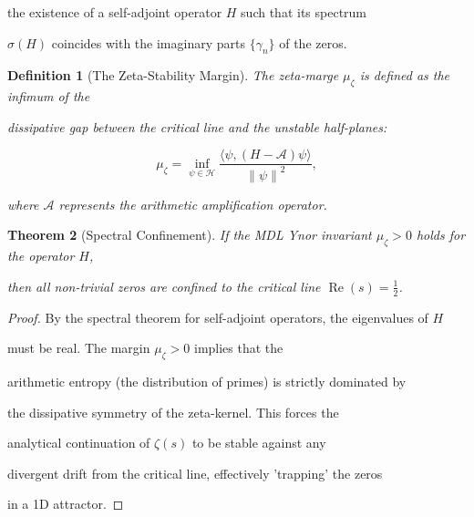 \documentclass[11pt,a4paper]{amsart}
\newtheorem{theorem}{Theorem}[section]
\newtheorem{definition}[theorem]{Definition}
\newcommand{\mumargin}{\ensuremath{\mu}}
\newcommand{\norm}[1]{\left\|#1\right\|}
\begin{document}
the existence of a self-adjoint operator $H$ such that its spectrum 

$\sigma(H)$ coincides with the imaginary parts $\{\gamma_n\}$ of the zeros.



\begin{definition}[The Zeta-Stability Margin]

The zeta-marge $\mumargin_{\zeta}$ is defined as the infimum of the 

dissipative gap between the critical line and the unstable half-planes:

\begin{equation}

    \mumargin_{\zeta} = \inf_{\psi \in \mathcal{H}} \frac{\langle \psi, (H - \mathscr{A})\psi \rangle}{\norm{\psi}^2},

\end{equation}

where $\mathscr{A}$ represents the arithmetic amplification operator.

\end{definition}



\begin{theorem}[Spectral Confinement]

If the MDL Ynor invariant $\mumargin_{\zeta} > 0$ holds for the operator $H$, 

then all non-trivial zeros are confined to the critical line $\operatorname{Re}(s) = \tfrac{1}{2}$.

\end{theorem}



\begin{proof}

By the spectral theorem for self-adjoint operators, the eigenvalues of $H$ 

must be real. The margin $\mumargin_{\zeta} > 0$ implies that the 

arithmetic entropy (the distribution of primes) is strictly dominated by 

the dissipative symmetry of the zeta-kernel. This forces the 

analytical continuation of $\zeta(s)$ to be stable against any 

divergent drift from the critical line, effectively 'trapping' the zeros 

in a 1D attractor.

\end{proof}
\end{document}
